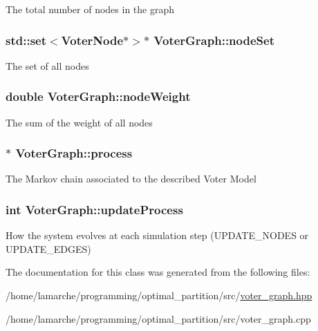 The total number of nodes in the graph \hypertarget{classVoterGraph_ab4c1bdbd12ebccd735841471984dfeec}{
\subsubsection[{node\-Set}]{\setlength{\rightskip}{0pt plus 5cm}std\-::set$<${\bf Voter\-Node}$\ast$$>$$\ast$ Voter\-Graph\-::node\-Set}}\label{classVoterGraph_ab4c1bdbd12ebccd735841471984dfeec}
The set of all nodes \hypertarget{classVoterGraph_a8108f0b182d1ca41ef567f7b729fe749}{
\subsubsection[{node\-Weight}]{\setlength{\rightskip}{0pt plus 5cm}double Voter\-Graph\-::node\-Weight}}\label{classVoterGraph_a8108f0b182d1ca41ef567f7b729fe749}
The sum of the weight of all nodes \hypertarget{classVoterGraph_a94b668c67f423d3a4ce25d5605a467cb}{
\subsubsection[{process}]{$\ast$ Voter\-Graph\-::process}}\label{classVoterGraph_a94b668c67f423d3a4ce25d5605a467cb}
The Markov chain associated to the described Voter Model \hypertarget{classVoterGraph_a11db0ef474064d44adb3ea22df8199ee}{
\subsubsection[{update\-Process}]{\setlength{\rightskip}{0pt plus 5cm}int Voter\-Graph\-::update\-Process}}\label{classVoterGraph_a11db0ef474064d44adb3ea22df8199ee}
How the system evolves at each simulation step (U\-P\-D\-A\-T\-E\-\_\-\-N\-O\-D\-E\-S or U\-P\-D\-A\-T\-E\-\_\-\-E\-D\-G\-E\-S) 

The documentation for this class was generated from the following files\-:\begin{DoxyCompactItemize}
\item 
/home/lamarche/programming/optimal\-\_\-partition/src/\hyperlink{voter__graph_8hpp}{voter\-\_\-graph.\-hpp}\item 
/home/lamarche/programming/optimal\-\_\-partition/src/voter\-\_\-graph.\-cpp\end{DoxyCompactItemize}
